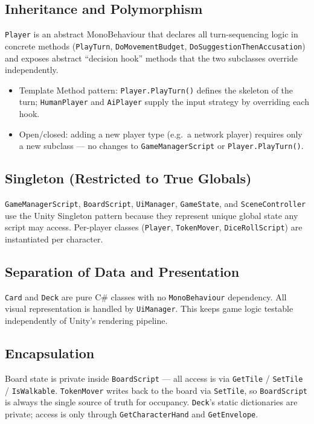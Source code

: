 \subsection*{Inheritance and Polymorphism}
\texttt{Player} is an abstract MonoBehaviour that declares all turn-sequencing logic in concrete methods (\texttt{PlayTurn}, \texttt{DoMovementBudget}, \texttt{DoSuggestionThenAccusation}) and exposes abstract ``decision hook'' methods that the two subclasses override independently.
\begin{itemize}
    \item Template Method pattern: \texttt{Player.PlayTurn()} defines the skeleton of the turn; \texttt{HumanPlayer} and \texttt{AiPlayer} supply the input strategy by overriding each hook.
    \item Open/closed: adding a new player type (e.g.\ a network player) requires only a new subclass --- no changes to \texttt{GameManagerScript} or \texttt{Player.PlayTurn()}.
\end{itemize}

\subsection*{Singleton (Restricted to True Globals)}
\texttt{GameManagerScript}, \texttt{BoardScript}, \texttt{UiManager}, \texttt{GameState}, and \texttt{SceneController} use the Unity Singleton pattern because they represent unique global state any script may access. Per-player classes (\texttt{Player}, \texttt{TokenMover}, \texttt{DiceRollScript}) are instantiated per character.

\subsection*{Separation of Data and Presentation}
\texttt{Card} and \texttt{Deck} are pure C\# classes with no \texttt{MonoBehaviour} dependency. All visual representation is handled by \texttt{UiManager}. This keeps game logic testable independently of Unity's rendering pipeline.

\subsection*{Encapsulation}
Board state is private inside \texttt{BoardScript} --- all access is via \texttt{GetTile} / \texttt{SetTile} / \texttt{IsWalkable}. \texttt{TokenMover} writes back to the board via \texttt{SetTile}, so \texttt{BoardScript} is always the single source of truth for occupancy. \texttt{Deck}'s static dictionaries are private; access is only through \texttt{GetCharacterHand} and \texttt{GetEnvelope}.

